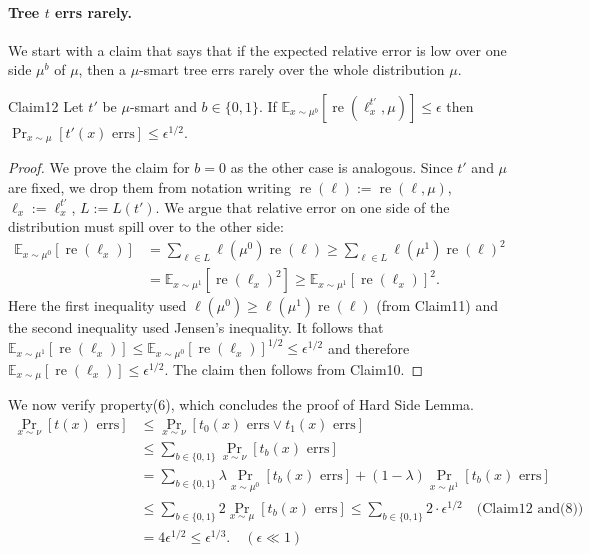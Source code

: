 \paragraph{Tree $t$ errs rarely.} We start with a claim that says that if the expected relative error is low over one side $\mu^b$ of $\mu$, then a $\mu$-smart tree errs rarely over the whole distribution $\mu$.
\begin{authorclaim}{Claim12}
Let $t'$ be $\mu$-smart and $b\in\{0,1\}$. If $\mathbb E_{x\sim\mu^b}[\operatorname{re}(\ell_x^{t'},\mu)]\le\epsilon$ then $\Pr_{x\sim\mu}[t'(x)\text{ errs}]\le\epsilon^{1/2}$.
\end{authorclaim}
\begin{proof}
We prove the claim for $b=0$ as the other case is analogous. Since $t'$ and $\mu$ are fixed, we drop them from notation writing $\operatorname{re}(\ell):=\operatorname{re}(\ell,\mu)$, $\ell_x:=\ell_x^{t'}$, $L:=L(t')$. We argue that relative error on one side of the distribution must spill over to the other side:
\begin{align*}
\mathbb E_{x\sim\mu^0}[\operatorname{re}(\ell_x)]&=\sum_{\ell\in L}\ell(\mu^0)\operatorname{re}(\ell)\ge\sum_{\ell\in L}\ell(\mu^1)\operatorname{re}(\ell)^2\\
&=\mathbb E_{x\sim\mu^1}[\operatorname{re}(\ell_x)^2]\ge\mathbb E_{x\sim\mu^1}[\operatorname{re}(\ell_x)]^2.
\end{align*}
Here the first inequality used $\ell(\mu^0)\ge\ell(\mu^1)\operatorname{re}(\ell)$ (from Claim11) and the second inequality used Jensen's inequality. It follows that $\mathbb E_{x\sim\mu^1}[\operatorname{re}(\ell_x)]\le\mathbb E_{x\sim\mu^0}[\operatorname{re}(\ell_x)]^{1/2}\le\epsilon^{1/2}$ and therefore $\mathbb E_{x\sim\mu}[\operatorname{re}(\ell_x)]\le\epsilon^{1/2}$. The claim then follows from Claim10.
\end{proof}
We now verify property(6), which concludes the proof of Hard Side Lemma.
\begin{align*}
\Pr_{x\sim\nu}[t(x)\text{ errs}]&\le\Pr_{x\sim\nu}[t_0(x)\text{ errs}\vee t_1(x)\text{ errs}]\\
&\le\sum_{b\in\{0,1\}}\Pr_{x\sim\nu}[t_b(x)\text{ errs}]\\
&=\sum_{b\in\{0,1\}}\lambda\Pr_{x\sim\mu^0}[t_b(x)\text{ errs}]+(1-\lambda)\Pr_{x\sim\mu^1}[t_b(x)\text{ errs}]\\
&\le\sum_{b\in\{0,1\}}2\Pr_{x\sim\mu}[t_b(x)\text{ errs}]\le\sum_{b\in\{0,1\}}2\cdot\epsilon^{1/2}\quad\text{(Claim12 and(8))}\\
&=4\epsilon^{1/2}\le\epsilon^{1/3}.\quad(\epsilon\ll1)
\end{align*}
